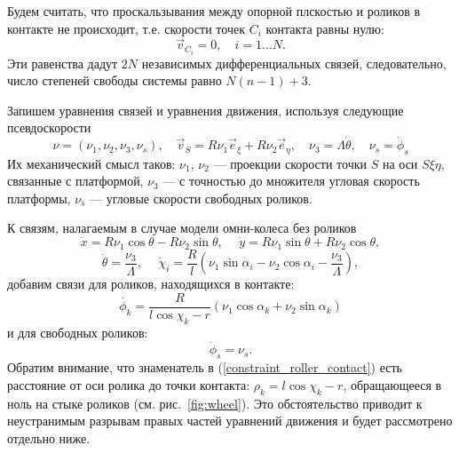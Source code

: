 Будем считать, что проскальзывания между опорной плскостью и роликов в контакте не происходит, т.е.
скорости точек $C_i$ контакта равны нулю:
$$\vec{v}_{C_i} = 0,\quad i = 1\dots N.$$
Эти равенства дадут $2N$ независимых дифференциальных связей, следовательно, число степеней свободы системы равно $N(n-1) +3$.

Запишем уравнения связей и уравнения движения, используя следующие псевдоскорости
$$\nu = (\nu_1, \nu_2, \nu_3, \nu_s), \quad \vec{v}_S = R\nu_1\vec{e}_\xi + R\nu_2\vec{e}_\eta, \quad \nu_3 = \Lambda\dot{\theta},\quad \nu_s = \dot{\phi}_s$$
Их механический смысл таков: $\nu_1$, $\nu_2$ --- проекции скорости точки $S$ на оси $S\xi\eta$, связанные с платформой, $\nu_3$ --- с точностью до множителя угловая скорость платформы, $\nu_s$ --- угловые скорости свободных роликов.

К связям, налагаемым в случае модели омни-колеса без роликов \cite{Zobova2011}
$$ \dot{x} = R \nu_1\cos\theta-R\nu_2\sin\theta, \hspace{15pt} \dot{y} = R\nu_1\sin\theta+R\nu_2\cos\theta,$$
$$\dot{\theta} = \frac{\nu_3}{\Lambda}, \hspace{15pt} \dot{\chi}_i = \frac{R}{l}(\nu_1\sin\alpha_i - \nu_2\cos\alpha_i - \frac{\nu_3}{\Lambda}),$$
добавим связи для роликов, находящихся в контакте:
\begin{equation}\label{constraint_roller_contact}
\dot{\phi_k} = \frac{R}{l\cos\chi_k-r}(\nu_1\cos\alpha_k + \nu_2\sin\alpha_k)    
\end{equation}
и для свободных роликов:
$$\dot{\phi}_s = \nu_s.$$
Обратим внимание, что  знаменатель в (\ref{constraint_roller_contact}) есть расстояние от оси ролика до точки контакта: $\rho_k = l\cos\chi_k - r$, обращающееся в ноль на стыке роликов (см. рис.~\ref{fig:wheel}). Это обстоятельство приводит к неустранимым разрывам правых частей уравнений движения и будет рассмотрено отдельно ниже.